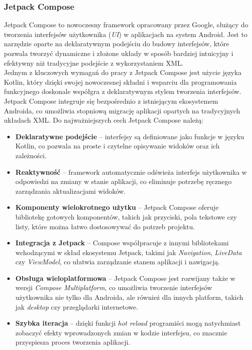 \documentclass[12pt]{article}
\begin{document}
\subsubsection{Jetpack Compose}
Jetpack Compose to nowoczesny framework opracowany przez Google, służący do tworzenia interfejsów użytkownika (\textit{UI}) w aplikacjach na system Android.
Jest to narzędzie oparte na deklaratywnym podejściu do budowy interfejsów, które pozwala tworzyć dynamiczne i złożone układy w sposób bardziej intuicyjny i efektywny
niż tradycyjne podejście z wykorzystaniem XML.\\
Jednym z kluczowych wymagań do pracy z Jetpack Compose jest użycie języka Kotlin, który dzięki swojej nowoczesnej składni i wsparciu dla programowania funkcyjnego
doskonale współgra z deklaratywnym stylem tworzenia interfejsów. Jetpack Compose integruje się bezpośrednio z istniejącym ekosystemem Androida,
co umożliwia stopniową migrację aplikacji opartych na tradycyjnych układach XML.
Do najważniejszych cech Jetpack Compose należą:
\begin{itemize}
    \item \textbf{Deklaratywne podejście} – interfejsy są definiowane jako funkcje w języku Kotlin, co pozwala na proste i czytelne opisywanie widoków oraz ich zależności.
    \item \textbf{Reaktywność} – framework automatycznie odświeża interfejs użytkownika w odpowiedzi na zmiany w stanie aplikacji,
          co eliminuje potrzebę ręcznego zarządzania aktualizacjami widoków.
    \item \textbf{Komponenty wielokrotnego użytku} – Jetpack Compose oferuje bibliotekę gotowych komponentów, takich jak przyciski, pola tekstowe czy listy,
          które można łatwo dostosowywać do potrzeb projektu.
    \item \textbf{Integracja z Jetpack} – Compose współpracuje z innymi bibliotekami wchodzącymi w skład ekosystemu Jetpack, takimi jak
          \textit{Navigation}, \textit{LiveData} czy \textit{ViewModel}, co ułatwia zarządzanie stanem aplikacji i nawigacją.
    \item \textbf{Obsługa wieloplatformowa} – Jetpack Compose jest rozwijany także w wersji \textit{Compose Multiplatform},
          co umożliwia tworzenie interfejsów użytkownika nie tylko dla Androida, ale również dla innych platform, takich jak \textit{desktop} czy przeglądarki internetowe.
    \item \textbf{Szybka iteracja} – dzięki funkcji \textit{hot reload} programiści mogą natychmiast zobaczyć efekty wprowadzonych zmian w kodzie interfejsu, co znacznie przyspiesza proces tworzenia aplikacji.
\end{itemize}
\end{document}
